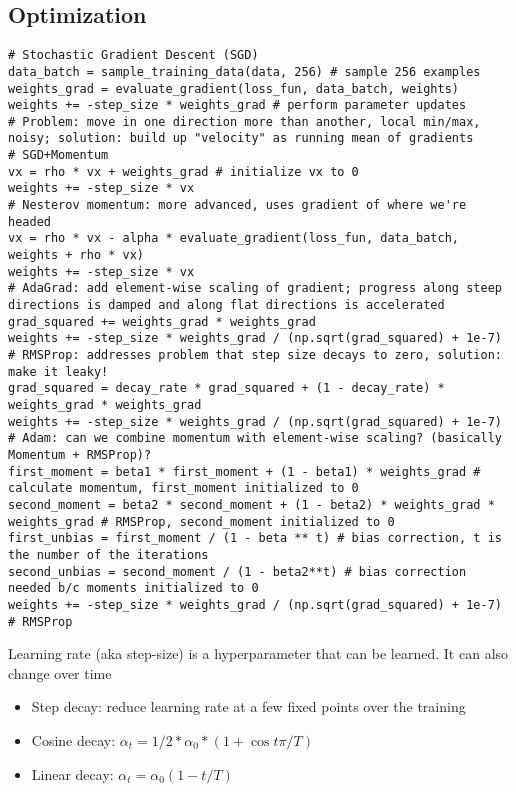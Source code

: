 \documentclass[9pt]{extarticle}
\begin{document}
\subsection{Optimization }
\begin{lstlisting}
# Stochastic Gradient Descent (SGD)
data_batch = sample_training_data(data, 256) # sample 256 examples
weights_grad = evaluate_gradient(loss_fun, data_batch, weights)
weights += -step_size * weights_grad # perform parameter updates
# Problem: move in one direction more than another, local min/max, noisy; solution: build up "velocity" as running mean of gradients
# SGD+Momentum
vx = rho * vx + weights_grad # initialize vx to 0
weights += -step_size * vx
# Nesterov momentum: more advanced, uses gradient of where we're headed
vx = rho * vx - alpha * evaluate_gradient(loss_fun, data_batch, weights + rho * vx)
weights += -step_size * vx
# AdaGrad: add element-wise scaling of gradient; progress along steep directions is damped and along flat directions is accelerated
grad_squared += weights_grad * weights_grad
weights += -step_size * weights_grad / (np.sqrt(grad_squared) + 1e-7)
# RMSProp: addresses problem that step size decays to zero, solution: make it leaky!
grad_squared = decay_rate * grad_squared + (1 - decay_rate) * weights_grad * weights_grad
weights += -step_size * weights_grad / (np.sqrt(grad_squared) + 1e-7)
# Adam: can we combine momentum with element-wise scaling? (basically Momentum + RMSProp)?
first_moment = beta1 * first_moment + (1 - beta1) * weights_grad # calculate momentum, first_moment initialized to 0
second_moment = beta2 * second_moment + (1 - beta2) * weights_grad * weights_grad # RMSProp, second_moment initialized to 0
first_unbias = first_moment / (1 - beta ** t) # bias correction, t is the number of the iterations
second_unbias = second_moment / (1 - beta2**t) # bias correction needed b/c moments initialized to 0
weights += -step_size * weights_grad / (np.sqrt(grad_squared) + 1e-7) # RMSProp
\end{lstlisting}
Learning rate (aka step-size) is a hyperparameter that can be learned. It can also change over time
\begin{itemize}
    \item Step decay: reduce learning rate at a few fixed points over the training
    \item Cosine decay: $\alpha_t = 1/2 * \alpha_0 * (1 + \cos{t\pi / T})$
    \item Linear decay: $\alpha_t = \alpha_0(1 - t/T)$
\end{itemize} 
\end{document}
